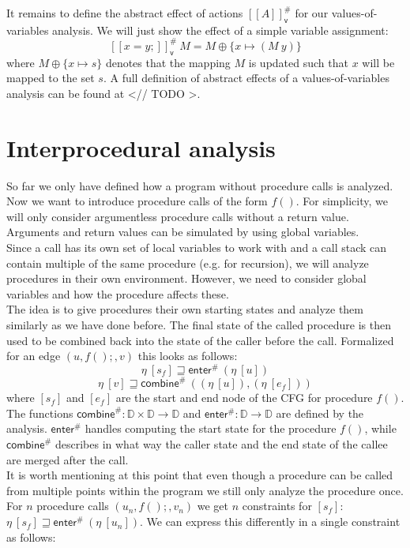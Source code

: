    It remains to define the abstract effect of actions $[\![A]\!]^{\#}_\textsf{v}$ for our values-of-variables analysis. We will just show the effect of a simple variable assignment:
    \[ [\![ x=y; ]\!]^{\#}_\textsf{v}\ M = M \oplus \{x \mapsto (M\ y) \} \]
    where $M \oplus \{x \mapsto s\}$ denotes that the mapping $M$ is updated such that $x$ will be mapped to the set $s$. A full definition of abstract effects of a values-of-variables analysis can be found at <// TODO >.\\

  \section{Interprocedural analysis}
    So far we only have defined how a program without procedure calls is analyzed. Now we want to introduce procedure calls of the form $f()$. For simplicity, we will only consider argumentless procedure calls without a return value. Arguments and return values can be simulated by using global variables.\\
    Since a call has its own set of local variables to work with and a call stack can contain multiple of the same procedure (e.g. for recursion), we will analyze procedures in their own environment. However, we need to consider global variables and how the procedure affects these.\\
    The idea is to give procedures their own starting states and analyze them similarly as we have done before. The final state of the called procedure is then used to be combined back into the state of the caller before the call. Formalized for an edge $(u, f();, v)$ this looks as follows:
    \[\eta\ [s_f] \sqsupseteq \textsf{enter}^{\#}\ (\eta\ [u]) \]
    \[\eta\ [v] \sqsupseteq  \textsf{combine}^{\#}\ ((\eta\ [u]), (\eta\ [e_f])) \]
    where $[s_f]$ and $[e_f]$ are the start and end node of the \ac{CFG} for procedure $f()$. The functions $\textsf{combine}^{\#}: \mathbb{D} \times \mathbb{D} \rightarrow \mathbb{D}$ and $\textsf{enter}^{\#}: \mathbb{D} \rightarrow \mathbb{D}$ are defined by the analysis. $\textsf{enter}^{\#}$ handles computing the start state for the procedure $f()$, while $\textsf{combine}^{\#}$ describes in what way the caller state and the end state of the callee are merged after the call.\\
    It is worth mentioning at this point that even though a procedure can be called from multiple points within the program we still only analyze the procedure once. For $n$ procedure calls $(u_n, f();, v_n)$ we get $n$ constraints for $[s_f]$: $\eta\ [s_f] \sqsupseteq \textsf{enter}^{\#}\ (\eta\ [u_n])$. We can express this differently in a single constraint as follows:
